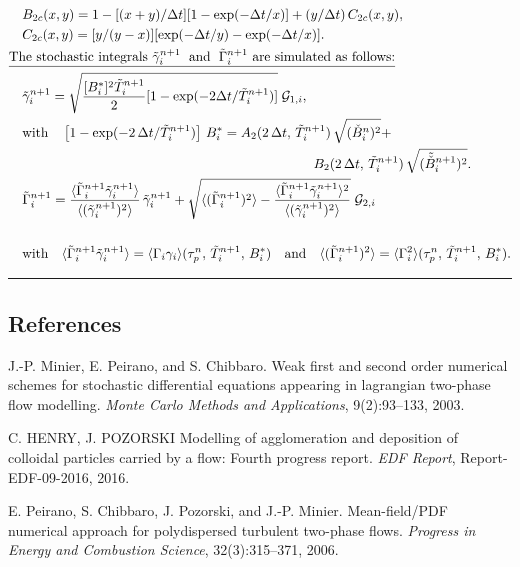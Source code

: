 \begin{table}[htbp]
\begin{align}
& \quad B_{2c}(x,y) =  1 - [(x+y)/\Delta t][1-\exp(-\Delta t/x)]
+ (y/\Delta t)\,C_{2c}(x,y), \notag\\
& \quad C_{2c}(x,y) = [y/(y-x)][\exp(-\Delta t/y)-\exp(-\Delta
  t/x)].\notag \\
& \text{\underline{The stochastic integrals
        $\tilde{\gamma}_i^{n+1}\;$ \text{and} $\;\tilde{\Gamma}_i^{n+1}$
        are simulated as follows:}}\notag \\
& \quad \tilde{\gamma}_i^{n+1}= \sqrt {\frac{[B_i^{*}]^2\tilde{T}_i^{n+1}}{2}
               [1-\exp(-2\Delta t/\tilde{T}_i^{n+1})]}\; {\mathcal G}_{1,i},\notag \\
& \quad \text{with} \quad \left[1-\exp(-2\,\Delta t/\tilde{T}_i^{n+1})\right]\,B_i^{*} =
    A_2(2\,\Delta t,\,\tilde{T}_i^{n+1})\,\sqrt{(\Check{B}_i^n)^2} + \notag \\
& \hskip 8.0cm B_2(2\,\Delta t,\,\tilde{T}_i^{n+1})\,\sqrt{(\tilde{\Check{B}}_i^{n+1})^2}. \notag \\
& \quad \tilde{\Gamma}_i^{n+1} =
  \frac{\lra{ \tilde{\Gamma}_i^{n+1}\tilde{\gamma}_i^{n+1} } }
     {\lra{(\tilde{\gamma}_i^{n+1})^2}}\,\tilde{\gamma}_i^{n+1}+
  \sqrt{\lra{(\tilde{\Gamma}_i^{n+1})^2}-
      \frac{\lra{\tilde{\Gamma}_i^{n+1}\tilde{\gamma}_i^{n+1}}^2}
           {\lra{(\tilde{\gamma}_i^{n+1})^2}} }\;{\mathcal G}_{2,i} \notag \\ \notag \\
& \quad \text{with}\quad \lra{ \tilde{\Gamma}_i^{n+1}\tilde{\gamma}_i^{n+1} } =
  \lra{\Gamma_i\gamma_i}(\tau_p^n,\,\tilde{T}_i^{n+1},\,B^{*}_i)
  \quad \text{and}\quad \lra{(\tilde{\Gamma}_i^{n+1})^2} =
  \lra{\Gamma_i^2}(\tau_p^n,\,\tilde{T}_i^{n+1},\,B^{*}_i). \notag
\end{align}
\hrule
\label{tab:lagrangian:sch2}
\end{table}

\clearpage

\subsection{References}

\begin{thebibliography}{3}

    J.-P. Minier, E. Peirano, and S. Chibbaro. Weak first
   and second order numerical schemes for stochastic differential equations
   appearing in lagrangian two-phase flow modelling.
   {\it Monte Carlo Methods and Applications}, 9(2):93–133, 2003.

    C. HENRY, J. POZORSKI
   Modelling of agglomeration and deposition of colloidal particles carried by a flow: Fourth progress report.
   {\it EDF Report}, Report-EDF-09-2016, 2016.

    E. Peirano, S. Chibbaro, J. Pozorski, and J.-P. Minier.
   Mean-field/PDF numerical approach for polydispersed turbulent two-phase flows.
   {\it Progress in Energy and Combustion Science}, 32(3):315–371, 2006.

\end{thebibliography}

